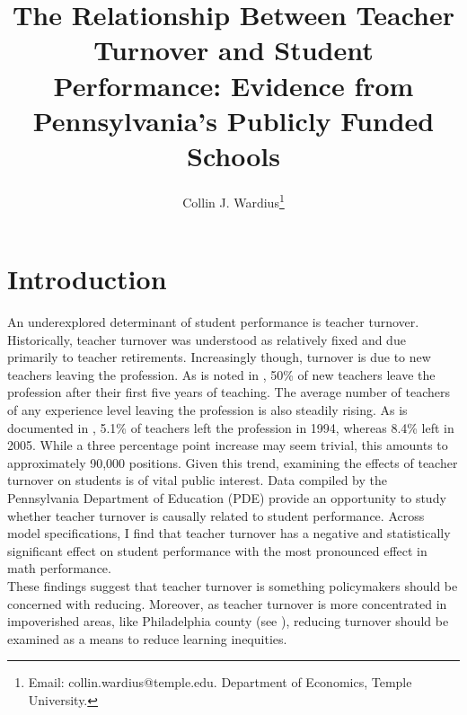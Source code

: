 \documentclass[12pt]{report}
\title{The Relationship Between Teacher Turnover and Student Performance: Evidence from Pennsylvania's Publicly Funded Schools}
\author{Collin J. Wardius\thanks{Email: collin.wardius@temple.edu. Department of Economics, Temple University.}}
\date{\parbox{\linewidth}{\centering%
  Economics 3598\endgraf\bigskip
  \today}}
\begin{document}
\maketitle

\doublespacing
\section{Introduction}
 
\normalsize \noindent An underexplored determinant of student performance is teacher turnover. Historically, teacher turnover was understood as relatively fixed and due primarily to teacher retirements. Increasingly though, turnover is due to new teachers leaving the profession. As is noted in \cite{watlington}, 50\% of new teachers leave the profession after their first five years of teaching. The average number of teachers of any experience level leaving the profession is also steadily rising. As is documented in \cite{hammond}, 5.1\% of teachers left the profession in 1994, whereas 8.4\% left in 2005. While a three percentage point increase may seem trivial, this amounts to approximately 90,000 positions. Given this trend, examining the effects of teacher turnover on students is of vital public interest. \newline
\indent Data compiled by the Pennsylvania Department of Education (PDE) provide an opportunity to study whether teacher turnover is causally related to student performance. Across model specifications, I find that teacher turnover has a negative and statistically significant effect on student performance with the most pronounced effect in math performance. \\ 
\indent These findings suggest that teacher turnover is something policymakers should be concerned with reducing. Moreover, as teacher turnover is more concentrated in impoverished areas, like Philadelphia county (see \cite{phl}), reducing turnover should be examined as a means to reduce learning inequities.
\end{document}
